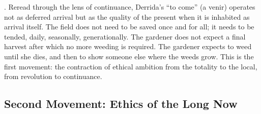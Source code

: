 \cite[pp.~167-169]{derrida_1993}. Reread through the lens of continuance, Derrida’s “to come” (a venir) operates not as deferred arrival but as the quality of the present when it is inhabited as arrival itself. The field does not need to be saved once and for all; it needs to be tended, daily, seasonally, generationally. The gardener does not expect a final harvest after which no more weeding is required. The gardener expects to weed until she dies, and then to show someone else where the weeds grow. This is the first movement: the contraction of ethical ambition from the totality to the local, from revolution to continuance.

\subsection{Second Movement: Ethics of the Long Now}


